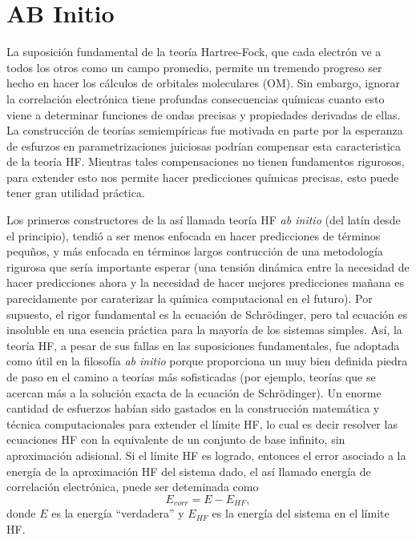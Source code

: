\section*{AB Initio}
La suposici\'on fundamental de la teor\'ia Hartree-Fock, que cada 
electr\'on ve a todos los otros como un campo promedio, permite un
tremendo progreso ser hecho en hacer los c\'alculos de orbitales
moleculares (OM). Sin embargo, ignorar la correlaci\'on electr\'onica
tiene profundas consecuencias qu\'imicas cuanto esto viene a 
determinar funciones de ondas precisas y propiedades derivadas de 
ellas. La construcci\'on de teor\'ias semiemp\'iricas fue motivada en
parte por la esperanza de esfurzos en parametrizaciones juiciosas
podr\'ian compensar esta caracteristica de la teor\'ia HF. Mientras
tales compensaciones no tienen fundamentos rigurosos, para extender
esto nos permite hacer predicciones qu\'imicas precisas, esto puede
tener gran utilidad pr\'actica.

Los primeros constructores de la as\'i llamada teor\'ia HF {\it ab 
initio} (del lat\'in desde el principio), tendi\'o a ser menos 
enfocada en hacer predicciones de t\'erminos pequ\~nos, y m\'as 
enfocada en t\'erminos largos contrucci\'on de una metodolog\'ia
rigurosa que ser\'ia importante esperar (una tensi\'on din\'amica
entre la necesidad de hacer predicciones ahora y la necesidad de hacer
mejores predicciones ma\~nana es parecidamente por caraterizar la 
qu\'imica computacional en el futuro). Por supuesto, el rigor 
fundamental es la ecuaci\'on de Schr\"odinger, pero tal ecuaci\'on es
insoluble en una esencia pr\'actica para la mayor\'ia de los sistemas
simples. As\'i, la teor\'ia HF, a pesar de sus fallas en las 
suposiciones fundamentales, fue adoptada como \'util en la 
filosof\'ia {\it ab initio} porque proporciona un muy bien definida 
piedra de paso en el camino a teor\'ias m\'as sofisticadas (por 
ejemplo, teor\'ias que se acercan m\'as a la soluci\'on exacta de la
ecuaci\'on de Schr\"odinger). Un enorme cantidad de esfuerzos 
hab\'ian sido gastados en la construcci\'on matem\'atica y t\'ecnica 
computacionales para extender el l\'imite HF, lo cual es decir 
resolver las ecuaciones HF con la equivalente  de un conjunto de base 
infinito, sin aproximaci\'on adisional. Si el l\'imite HF es logrado,
entonces el error asociado a la energ\'ia de la aproximaci\'on HF del
sistema dado, el as\'i llamado energ\'ia de correlaci\'on 
electr\'onica, puede ser deteminada como
$$E_{corr}=E-E_{HF},$$
donde $E$ es la energ\'ia ``verdadera'' y $E_{HF}$ es la energ\'ia del 
sistema en el l\'imite HF.

